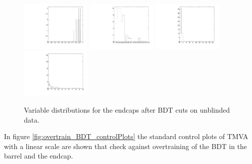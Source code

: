 \begin{figure}
  \includegraphics[width=0.3\textwidth]{Figures/AfterBDTCut_iso_EndcapsUnblinded.pdf}
  \includegraphics[width=0.3\textwidth]{Figures/AfterBDTCut_docatrk_EndcapsUnblinded.pdf}
  \includegraphics[width=0.3\textwidth]{Figures/AfterBDTCut_closetrk_EndcapsUnblinded.pdf}
  \includegraphics[width=0.3\textwidth]{Figures/AfterBDTCut_chi2dof_EndcapsUnblinded.pdf}
  \caption{Variable distributions for the endcaps after BDT cuts on unblinded data.}
  \label{fig:AfterBDTCutVariablesEndcapsUnblinded}
\end{figure}

In figure \ref{fig:overtrain_BDT_controlPlots} the standard control plots of TMVA with a linear scale are shown that check against overtraining of the BDT in the barrel and the endcap. 

